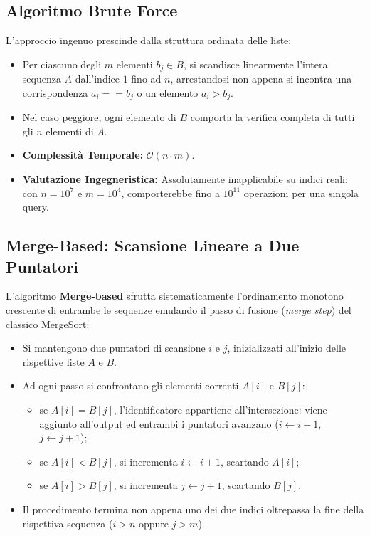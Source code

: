 \subsection{Algoritmo Brute Force}
L'approccio ingenuo prescinde dalla struttura ordinata delle liste:
\begin{itemize}
  \item Per ciascuno degli $m$ elementi $b_j \in B$, si scandisce linearmente l'intera sequenza $A$ dall'indice $1$ fino ad $n$, arrestandosi non appena si incontra una corrispondenza $a_i == b_j$ o un elemento $a_i > b_j$.
  \item Nel caso peggiore, ogni elemento di $B$ comporta la verifica completa di tutti gli $n$ elementi di $A$.
  \item \textbf{Complessità Temporale:} $\mathcal{O}(n \cdot m)$.
  \item \textbf{Valutazione Ingegneristica:} Assolutamente inapplicabile su indici reali: con $n = 10^7$ e $m = 10^4$, comporterebbe fino a $10^{11}$ operazioni per una singola query.
\end{itemize}

\FloatBarrier
\subsection{Merge-Based: Scansione Lineare a Due Puntatori}
L'algoritmo \textbf{Merge-based} sfrutta sistematicamente l'ordinamento monotono crescente di entrambe le sequenze emulando il passo di fusione (\textit{merge step}) del classico MergeSort:
\begin{itemize}
  \item Si mantengono due puntatori di scansione $i$ e $j$, inizializzati all'inizio delle rispettive liste $A$ e $B$.
  \item Ad ogni passo si confrontano gli elementi correnti $A[i]$ e $B[j]$:
  \begin{itemize}
    \item se $A[i] = B[j]$, l'identificatore appartiene all'intersezione: viene aggiunto all'output ed entrambi i puntatori avanzano ($i \leftarrow i + 1$, $j \leftarrow j + 1$);
    \item se $A[i] < B[j]$, si incrementa $i \leftarrow i + 1$, scartando $A[i]$;
    \item se $A[i] > B[j]$, si incrementa $j \leftarrow j + 1$, scartando $B[j]$.
  \end{itemize}
  \item Il procedimento termina non appena uno dei due indici oltrepassa la fine della rispettiva sequenza ($i > n$ oppure $j > m$).
\end{itemize}

